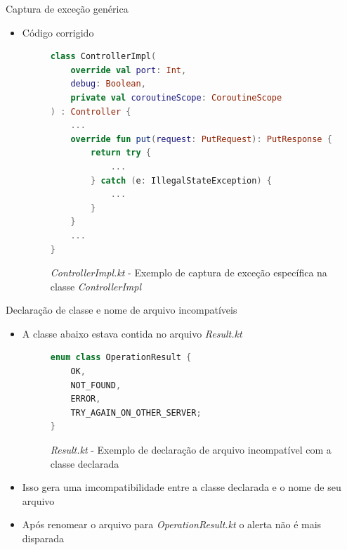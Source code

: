 \documentclass[brazilian]{beamer}
\begin{document}
\begin{frame}[fragile]{Captura de exceção genérica}
    \begin{itemize}
        \item Código corrigido
        \begin{figure}[H]
    \centering
    \begin{lstlisting}[language=Kotlin]
class ControllerImpl(
    override val port: Int,
    debug: Boolean,
    private val coroutineScope: CoroutineScope
) : Controller {
    ...
    override fun put(request: PutRequest): PutResponse {
        return try {
            ...
        } catch (e: IllegalStateException) {
            ...
        }
    }
    ...
}
    \end{lstlisting}
    \caption{\textit{ControllerImpl.kt} - Exemplo de captura de exceção específica na classe \textit{ControllerImpl}}
    \label{fig:detekt_too_generic_exception_after_example}
\end{figure}
    \end{itemize}
\end{frame}

\begin{frame}[fragile]{Declaração de classe e nome de arquivo incompatíveis}
    \begin{itemize}
        \item A classe abaixo estava contida no arquivo \emph{Result.kt}
        \begin{figure}[H]
            \centering
            \begin{lstlisting}[language=Kotlin]
enum class OperationResult {
    OK,
    NOT_FOUND,
    ERROR,
    TRY_AGAIN_ON_OTHER_SERVER;
}
            \end{lstlisting}
            \caption{\textit{Result.kt} - Exemplo de declaração de arquivo incompatível com a classe declarada}
            \label{fig:detekt_matching_declaration_name_before_example}
        \end{figure}
        \item Isso gera uma imcompatibilidade entre a classe declarada e o nome de seu arquivo
        \item Após renomear o arquivo para \emph{OperationResult.kt} o alerta não é mais disparada
    \end{itemize}
\end{frame}
\end{document}
